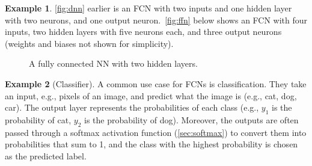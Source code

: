 \documentclass[oneside,11pt,dvipsnames]{book}
\numberwithin{equation}{section}
\theoremstyle{definition}
\newtheorem{example}{Example}[section]
\theoremstyle{remark}
\begin{document}
\begin{example}
\autoref{fig:dnn} earlier is an FCN with two inputs and one hidden layer with two neurons, and one output neuron.~\autoref{fig:ffn} below shows an FCN with four inputs, two hidden layers with five neurons each, and three output neurons (weights and biases not shown for simplicity).

\begin{figure}[htp]
    \centering
    \caption{A fully connected NN with two hidden layers.}
    \label{fig:ffn}
\end{figure}
\end{example}


\begin{example}[Classifier]
A common use case for FCNs is classification. They take an input, e.g., pixels of an image, and predict what the image is (e.g., cat, dog, car). The output layer represents the probabilities of each class (e.g., $y_1$ is the probability of cat, $y_2$ is the probability of dog). Moreover, the outputs are often passed through a softmax activation function (\autoref{sec:softmax}) to convert them into probabilities that sum to 1, and the class with the highest probability is chosen as the predicted label.

\end{example}
\end{document}
